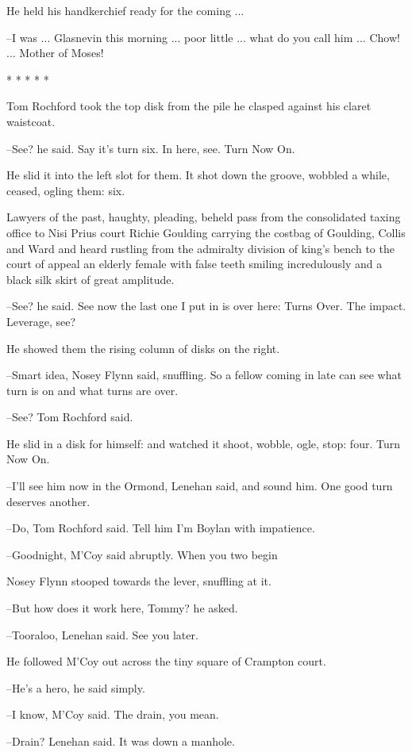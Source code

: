 He held his handkerchief ready for the coming ...

--I was ...
Glasnevin this morning ...
poor little ...
what do you call him ...
Chow! ...
Mother of Moses!


    * * * * *


Tom Rochford took the top disk from the pile
he clasped against his claret waistcoat.

--See?
he said.
Say it's turn six.
In here, see.
Turn Now On.

He slid it into the left slot for them.
It shot down the groove,
wobbled a while,
ceased,
ogling them:
six.

Lawyers of the past, haughty, pleading,
beheld pass from the
consolidated taxing office
to Nisi Prius court
Richie Goulding carrying
the costbag of Goulding, Collis and Ward
and heard rustling from the
admiralty division of king's bench
to the court of appeal
an elderly
female with false teeth smiling incredulously
and a black silk skirt of
great amplitude.

--See?
he said.
See now the last one I put in is over here:
Turns Over.
The impact. Leverage, see?

He showed them the rising column of disks on the right.

--Smart idea,
Nosey Flynn said, snuffling.
So a fellow coming in late can
see what turn is on and what turns are over.

--See?
Tom Rochford said.

He slid in a disk for himself:
and watched it shoot, wobble, ogle, stop:
four.
Turn Now On.

--I'll see him now in the Ormond,
Lenehan said,
and sound him.
One good
turn deserves another.

--Do,
Tom Rochford said.
Tell him I'm Boylan with impatience.

--Goodnight,
M'Coy said abruptly.
When you two begin

Nosey Flynn stooped towards the lever,
snuffling at it.

--But how does it work here, Tommy?
he asked.

--Tooraloo,
Lenehan said.
See you later.

He followed M'Coy out
across the tiny square of Crampton court.

--He's a hero,
he said simply.

--I know,
M'Coy said.
The drain, you mean.

--Drain?
Lenehan said.
It was down a manhole.

